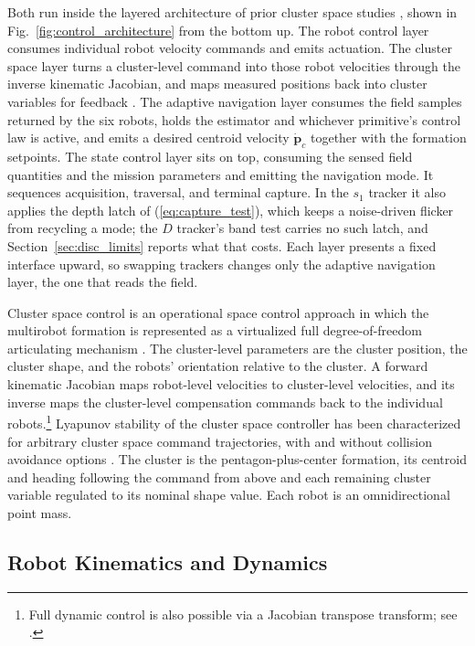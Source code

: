 \documentclass[lettersize,journal]{IEEEtran}
\begin{document}
Both run inside the layered architecture of prior cluster space studies
\cite{8,31}, shown in Fig.~\ref{fig:control_architecture} from the
bottom up. The robot control layer consumes individual robot velocity
commands and emits actuation. The cluster space layer turns a
cluster-level command into those robot velocities through the inverse
kinematic Jacobian, and maps measured positions back into cluster
variables for feedback \cite{31,32}. The adaptive
navigation layer consumes the field samples returned by the six
robots, holds the estimator and
whichever primitive's control law is active, and emits a desired
centroid velocity $\dot{\mathbf{p}}_c$ together with the formation
setpoints. The state control layer sits on top, consuming the sensed
field quantities and the mission parameters and emitting the navigation
mode. It sequences acquisition, traversal, and terminal capture. In the
$s_1$ tracker it also applies the depth latch of
(\ref{eq:capture_test}), which keeps a noise-driven flicker from
recycling a mode; the $D$ tracker's band test carries no such latch,
and Section~\ref{sec:disc_limits} reports what that costs. Each layer
presents a fixed interface upward, so swapping trackers changes only
the adaptive navigation layer, the one that reads the field.

Cluster space control is an operational space control approach in
which the multirobot formation is represented as a virtualized full
degree-of-freedom articulating mechanism \cite{31}. The cluster-level
parameters are the cluster position, the cluster shape, and the robots'
orientation relative to the cluster. A
forward kinematic Jacobian maps robot-level velocities to cluster-level
velocities, and its inverse maps the cluster-level compensation
commands back to the individual robots.\footnote{Full dynamic control
is also possible via a Jacobian transpose transform; see \cite{31}.}
Lyapunov stability of the cluster space controller has been
characterized for arbitrary cluster space command trajectories, with
and without collision avoidance options \cite{32}. The cluster is the
pentagon-plus-center formation, its centroid
and heading following the command from above and each remaining cluster
variable regulated to its nominal shape value. Each robot is an
omnidirectional point mass.

\subsection{Robot Kinematics and Dynamics}
\label{sec:robot_model}
\end{document}
